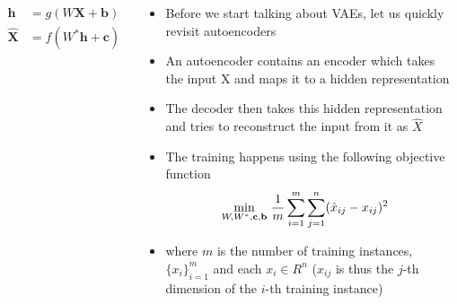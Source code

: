 \begin{frame}
\end{frame}

\begin{frame}
\end{frame}


\begin{frame}
	\begin{columns}
		\begin{overlayarea}{\textwidth}{\textheight}
			\vspace{3pt}
			
			\vspace{-20pt}
			\begin{align*}
				\mathbf{h} &= g(W\mathbf{X} +\mathbf{b})\\
				\mathbf{\hat{X}} &= f(W^*\mathbf{h} +\mathbf{c})      
			\end{align*}

		\end{overlayarea}
		\begin{overlayarea}{\textwidth}{\textheight}
			\begin{itemize}[<+->]\justifying
				\item Before we start talking about VAEs, let us quickly revisit autoencoders
				\item An autoencoder contains an encoder which takes the input X and maps it to a hidden representation
				\item The decoder then takes this hidden representation and tries to reconstruct the input from it as $\hat{X}$
				\item The training happens using the following objective function
				\vspace{-0.1in}
				\small {
					\begin{align*} 
					& \min \limits_{W,W^*,\mathbf{c},\mathbf{b}}\hspace{0.5mm} \frac{1}{m}\sum_{i=1}^{m}\sum_{j=1}^{n} (\hat{x}_{ij}- x_{ij})^2 
					\end{align*}
				}
                \vspace{-0.1in}
                \item where $m$ is the number of training instances, $\{x_i\}_{i=1}^{m}$ and each $x_i \in R^n$ ($x_{ij}$ is thus the $j$-th dimension of the $i$-th training instance)
			\end{itemize}
		\end{overlayarea}
	\end{columns}
\end{frame}


